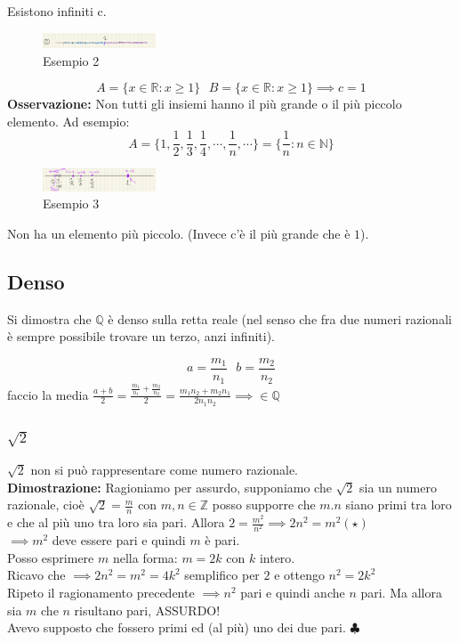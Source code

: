 \documentclass{article}
\newcommand{\R}{\mathbb{R}}
\begin{document}
Esistono infiniti c.

\begin{figure}[!ht]
    \centering
    \includegraphics[width=0.3\textwidth]{2.png}
    \caption{Esempio 2}
    \label{fig:2}
\end{figure}
\[
    A = \{x \in \R : x \geq 1\} \ \ \ B = \{x \in \R : x \geq 1\} \implies c = 1
\]
\textbf{Osservazione:} Non tutti gli insiemi hanno il più grande o il più piccolo elemento. Ad esempio:
\[
    A = \{1, \frac{1}{2}, \frac{1}{3}, \frac{1}{4}, \cdots, \frac{1}{n}, \cdots\} = \{\frac{1}{n} : n\in \mathbb{N}\}
\]
\begin{figure}[h]
    \centering
    \includegraphics[width=0.3\textwidth]{3.png}
    \caption{Esempio 3}
    \label{fig:3}
\end{figure}

Non ha un elemento più piccolo. (Invece c'è il più grande che è $1$).

\subsection{Denso}
Si dimostra che $\mathbb{Q}$ è denso sulla retta reale (nel senso che fra due
numeri razionali è sempre possibile trovare un terzo, anzi infiniti).

\[
    a = \frac{m_1}{n_1} \ \ \ b = \frac{m_2}{n_2}
\]
faccio la media $\frac{a+b}{2} =\frac{\frac{m_1}{n_1} + \frac{m_2}{n_2}}{2} =
    \frac{m_1n_2 + m_2n_1}{2n_1n_2} \implies \in \mathbb{Q}$

\subsubsection{$\sqrt{2}$}
$\sqrt{2}$ non si può rappresentare come numero razionale.\\
\textbf{Dimostrazione:} Ragioniamo per assurdo, supponiamo che $\sqrt{2}$ sia un numero razionale, cioè $\sqrt{2} = \frac{m}{n}$ con $m,n \in \mathbb{Z}$ posso supporre che $m. n$ siano primi tra loro e che al più uno tra loro sia pari.
Allora $2 = \frac{m^2}{n^2} \implies  2n^2 = m^2 (\star)$\\
$\implies m^2$ deve essere pari e quindi $m$ è pari.\\
Posso esprimere $m$ nella forma: $m = 2k$ con $k$ intero.\\
Ricavo che $\implies 2n^2 = m^2 = 4k^2$ semplifico per $2$ e ottengo $n^2 = 2k^2$\\
Ripeto il ragionamento precedente $\implies n^2$ pari e quindi anche $n$ pari. Ma allora sia $m$ che $n$ risultano pari, ASSURDO!\\
Avevo supposto che fossero primi ed (al più) uno dei due pari. $\clubsuit$
\end{document}
